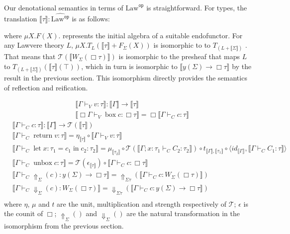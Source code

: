 \documentclass[acmsmall, screen, nonacm]{acmart}
\newcommand{\glob}{\mathop{\Box}}
\newcommand{\terminal}{\top}
\newcommand{\lawc}{\mathrm{Law}}
\newcommand{\lawcop}{\lawc^{\mathtt{op}}}
\newcommand{\pshlawcop}{\widehat{\lawcop}}
\newcommand{\yoneda}[1]{y(#1)}
\newcommand{\arrow}[2]{#1 \Rightarrow #2}
\newcommand{\sem}[1]{\llbracket #1 \rrbracket}
\newcommand{\reflectname}{\Uparrow}
\newcommand{\reflect}[2]{\reflectname_{#1}(#2)}
\newcommand{\reifyname}{\Downarrow}
\newcommand{\reify}[2]{\reifyname_{#1}(#2)}
\newcommand{\mon}{\mathcal{T}}
\newcommand{\ind}[1]{W_{#1}}
\begin{document}
Our denotational semantics in terms of $\pshlawcop$ is
straightforward. For types, the translation $\sem{\tau} \mathrel{:} \pshlawcop$ is as follows:
where $\mu X. F(X).$ represents the initial algebra of a suitable
endofunctor. For any Lawvere theory $L$,
$\mu X.T_L(\sem{\tau} + F_\Sigma(X))$ is isomorphic to to
$T_{(L + \sem{\Sigma})}$ \cite{hyland2006combining}. That means that
$\mon(\sem{\ind{\Sigma}(\glob \tau)})$ is isomorphic to the presheaf that
maps $L$ to $T_{(L + \sem{\Sigma})}(\sem{\tau}(\terminal))$, which in
turn is isomorphic to $\sem{\yoneda{\Sigma} \rightarrow \glob \tau}$ by the
result in the previous section. This isomorphism directly provides the
semantics of reflection and reification.

\begin{align*}
&\sem{\Gamma \vdash_V v \mathop{:} \tau} \mathrel{:} \sem{\Gamma} \rightarrow \sem{\tau} \\
&\sem{\glob \Gamma \vdash_V \mathop{\mathrm{box}} c \mathop{:} \glob \tau} = \glob \sem{\Gamma \vdash_C c \mathop{:} \tau}
\end{align*}
\begin{align*}
&\sem{\Gamma \vdash_C c \mathop{:} \tau} \mathrel{:} \sem{\Gamma} \rightarrow \mon(\sem{\tau}) \\
&\sem{\Gamma \vdash_C \mathop{\mathrm{return}} v \mathop{:} \tau} = \eta_{\sem{\tau}} \circ \sem{\Gamma \vdash_V v \mathop{:} \tau} \\
&\sem{\Gamma \vdash_C \mathop{\mathrm{let}} x : \tau_1 = c_1 \mathop{\mathrm{in}} c_2\mathop{:} \tau_2} = \mu_{\sem{\tau_2}} \circ \mon(\sem{\Gamma; x \mathop{:} \tau_1 \vdash_C C_2 \mathop{:} \tau_2}) \circ t_{\sem{\Gamma}, \sem{\tau_1}} \circ \langle id_{\sem{\Gamma}}, \sem{\Gamma \vdash_C C_1 \mathop{:} \tau} \rangle \\
&\sem{\Gamma \vdash_C \mathop{\mathrm{unbox}} c \mathop{:} \tau} = \mon(\epsilon_{\sem{\tau}}) \circ \sem{\Gamma \vdash_C c \mathop{:} \glob \tau} \\
&\sem{\Gamma \vdash_C \reflect{\Sigma}{c} \mathop{:} \yoneda{\Sigma} \rightarrow \glob \tau} = \reflect{\Sigma\tau}{\sem{\Gamma \vdash_C c \mathop{:} \ind{\Sigma}(\glob \tau)}} \\
&\sem{\Gamma \vdash_C \reify{\Sigma}{c} \mathop{:} \ind{\Sigma}(\glob \tau)} = \reify{\Sigma\tau}{\sem{\Gamma \vdash_C c \mathop{:} \yoneda{\Sigma} \rightarrow \glob \tau}} \\
\end{align*}
where $\eta$, $\mu$ and $t$ are the unit, multiplication and strength
respectively of $\mon$; $\epsilon$ is the counit of $\glob$;
$\reflect{\Sigma}{}$ and $\reify{\Sigma}{}$ are the natural
transformation in the isomorphism from the previous section.
\end{document}
